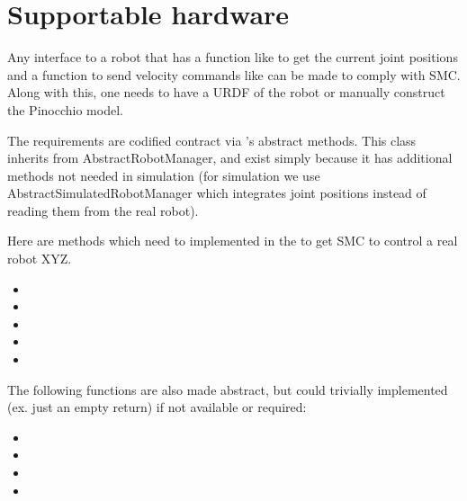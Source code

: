 \section{Supportable hardware}
\label{sec-supportable-hardware}
Any interface to a robot that has a function like
 to get the current joint positions
and a function to send velocity commands like
can be made to comply with SMC.
Along with this, one needs to have a URDF of the robot
or manually construct the Pinocchio model.

The requirements are codified contract via 
's 
abstract methods.
This class inherits from AbstractRobotManager,
and exist simply because it has additional methods not needed in simulation
(for simulation we use AbstractSimulatedRobotManager which integrates
joint positions instead of reading them from the real robot).


Here are methods which need to implemented
in the  to get SMC to control a real robot XYZ.
\begin{itemize}
		\item {}
		\item {}
		\item {}
		\item {}
		\item {}
\end{itemize}

The following functions are also made abstract,
but could trivially implemented (ex. just an empty return)
if not available or required:
\begin{itemize}
		\item {}
		\item {}
		\item {}
		\item {}
\end{itemize}
